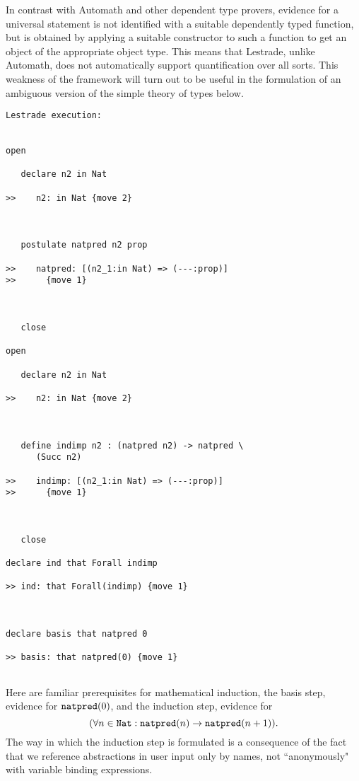 \documentclass[12pt]{article}
\begin{document}
In contrast with Automath and other dependent type provers, evidence for a universal statement is not identified with a suitable dependently typed function, but is obtained by applying a suitable constructor to such a function to get an object of the appropriate object type.  This means that Lestrade, unlike Automath, does not automatically support quantification over all sorts.  This weakness of the framework will turn out to be useful in the formulation of an ambiguous version of the simple theory of types below.

\begin{verbatim}Lestrade execution:


open

   declare n2 in Nat

>>    n2: in Nat {move 2}



   postulate natpred n2 prop

>>    natpred: [(n2_1:in Nat) => (---:prop)]
>>      {move 1}



   close

open

   declare n2 in Nat

>>    n2: in Nat {move 2}



   define indimp n2 : (natpred n2) -> natpred \
      (Succ n2)

>>    indimp: [(n2_1:in Nat) => (---:prop)]
>>      {move 1}



   close

declare ind that Forall indimp

>> ind: that Forall(indimp) {move 1}



declare basis that natpred 0

>> basis: that natpred(0) {move 1}


\end{verbatim}

Here are familiar prerequisites for mathematical induction, the basis step, evidence for ${\tt natpred}(0)$, and the induction step, evidence for $$(\forall n \in {\tt Nat}:{\tt natpred}(n) \rightarrow {\tt natpred}(n+1) ).$$ The way in which the induction step is formulated is a consequence of the fact that we reference abstractions in user input only by names, not ``anonymously" with variable binding expressions.
\end{document}
